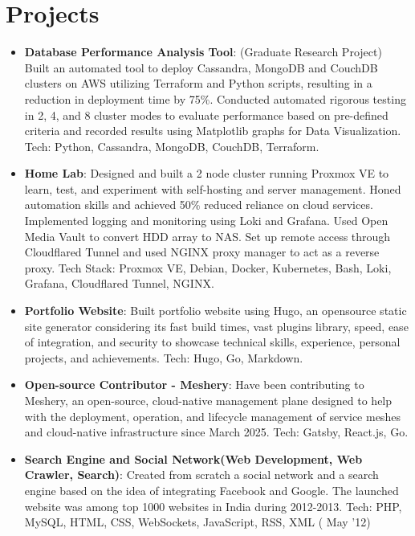 \documentclass[a4paper,20pt]{article}
\newcommand{\resumeItem}[2]{
  \item\small{
    \textbf{#1}{: #2 \vspace{-2pt}}
  }
}
\newcommand{\resumeSubItem}[2]{\resumeItem{#1}{#2}\vspace{-3pt}}
\newcommand{\resumeSubHeadingListStart}{\begin{itemize}[leftmargin=*]}
\newcommand{\resumeSubHeadingListEnd}{\end{itemize}}
\begin{document}
\section{Projects}
\resumeSubHeadingListStart
\resumeSubItem{Database Performance Analysis Tool}{(Graduate Research Project) Built an automated tool to deploy Cassandra, MongoDB and CouchDB clusters on AWS utilizing Terraform and Python scripts, resulting in a reduction in deployment time by 75\%. Conducted automated rigorous testing in 2, 4, and 8 cluster modes to evaluate performance based on pre-defined
criteria and recorded results using Matplotlib graphs for Data Visualization. Tech: Python, Cassandra, MongoDB, CouchDB, Terraform.}
\vspace{2pt}
\resumeSubItem{Home Lab} {Designed and built a 2 node cluster running Proxmox VE to learn, test, and experiment with self-hosting and server management. Honed automation skills and achieved 50\% reduced reliance on cloud services. Implemented logging and monitoring using Loki and Grafana. Used Open Media Vault to convert HDD array to NAS. Set up remote access through Cloudflared Tunnel and used NGINX proxy manager to act as a reverse proxy. Tech Stack: Proxmox VE, Debian, Docker, Kubernetes, Bash, Loki, Grafana, Cloudflared Tunnel, NGINX.}
\vspace{2pt}
\resumeSubItem{Portfolio Website}{Built portfolio website using Hugo, an opensource static site generator considering its fast build times, vast plugins library, speed, ease of integration, and security to showcase technical skills, experience, personal projects,
and achievements.  Tech: Hugo, Go, Markdown.}
\vspace{2pt}
\resumeSubItem{Open-source Contributor - Meshery}{Have been contributing to Meshery, an open-source, cloud-native management plane designed to help with the deployment, operation, and lifecycle management of service meshes and cloud-native infrastructure since March 2025. Tech: Gatsby, React.js, Go.}
\vspace{2pt}
\resumeSubItem{Search Engine and Social Network(Web Development, Web Crawler, Search)}{Created from scratch a social network and a search engine based on the idea of integrating Facebook and Google. The launched website was among top 1000 websites in India during 2012-2013. Tech: PHP, MySQL, HTML, CSS, WebSockets, JavaScript, RSS, XML ( May '12)}
\resumeSubHeadingListEnd
\vspace{-5pt}

\end{document}
